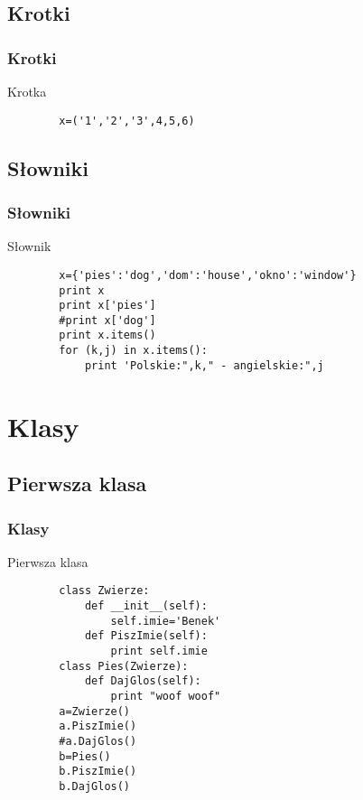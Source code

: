 \documentclass[10pt]{beamer}
\begin{document}
\subsection{Krotki}
\begin{frame}[fragile]
	\frametitle{Krotki}
	\begin{block}
		{Krotka}
		\begin{lstlisting}
		x=('1','2','3',4,5,6)
		\end{lstlisting}
	\end{block}
\end{frame}
\subsection{Słowniki}
\begin{frame}[fragile]
	\frametitle{Słowniki}
	\begin{block}
		{Słownik}
		\begin{lstlisting}
		x={'pies':'dog','dom':'house','okno':'window'}
		print x
		print x['pies']
		#print x['dog']
		print x.items()
		for (k,j) in x.items():
			print 'Polskie:",k," - angielskie:",j
		\end{lstlisting}
	\end{block}
\end{frame}
\section{Klasy}
\subsection{Pierwsza klasa}
\begin{frame}[fragile]
	\frametitle{Klasy}
	\begin{block}
		{Pierwsza klasa}
		\begin{lstlisting}
		class Zwierze:
		    def __init__(self):
		        self.imie='Benek'
		    def PiszImie(self):
		        print self.imie
		class Pies(Zwierze):
		    def DajGlos(self):
		        print "woof woof"
		a=Zwierze()
		a.PiszImie()
		#a.DajGlos()
		b=Pies()
		b.PiszImie()
		b.DajGlos()
		\end{lstlisting}
	\end{block}
\end{frame}
\end{document}
